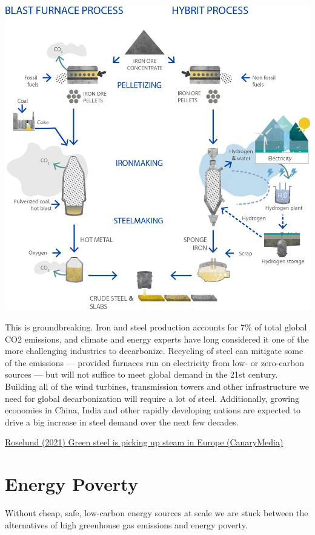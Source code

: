 \documentclass[
]{book}
\begin{document}
\includegraphics{fig/hybrit-h2-based-ironmaking-en.jpg}

This is groundbreaking. Iron and steel production accounts for 7\% of total global CO2 emissions, and climate and energy experts have long considered it one of the more challenging industries to decarbonize. Recycling of steel can mitigate some of the emissions --- provided furnaces run on electricity from low- or zero-carbon sources --- but will not suffice to meet global demand in the 21st century. Building all of the wind turbines, transmission towers and other infrastructure we need for global decarbonization will require a lot of steel. Additionally, growing economies in China, India and other rapidly developing nations are expected to drive a big increase in steel demand over the next few decades.

\href{https://www.canarymedia.com/articles/green-steel-is-coming-sooner-than-you-think/}{Roselund (2021) Green steel is picking up steam in Europe (CanaryMedia)}

\hypertarget{energy-poverty}{%
\chapter{Energy Poverty}\label{energy-poverty}}

Without cheap, safe, low-carbon energy sources at scale
we are stuck between the alternatives of high greenhouse gas emissions
and energy poverty.
\end{document}
